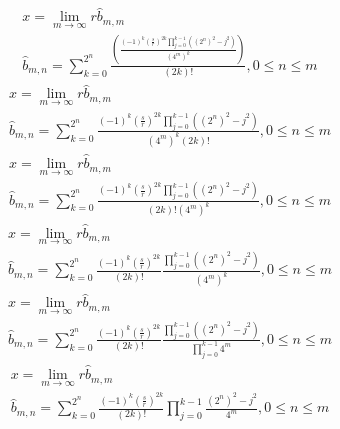 \documentclass[a4paper,12pt]{report}
\begin{document}
\begin{subequations}
\begin{gather}
x = \lim \limits_{m \to \infty} r \hat{b}_{m,m} \\
\hat{b}_{m,n} = \sum \limits_{k=0}^{2^n} \frac{\left(\frac{(-1)^k \left(\frac{s}{r}\right)^{2k} \prod \limits_{j=0}^{k-1} ((2^n)^2 - j^2)}{(4^m)^k}\right)}{(2k)!}, 0 \leq n \leq m
\end{gather}
\end{subequations}
\begin{subequations}
\begin{gather}
x = \lim \limits_{m \to \infty} r \hat{b}_{m,m} \\
\hat{b}_{m,n} = \sum \limits_{k=0}^{2^n} \frac{(-1)^k \left(\frac{s}{r}\right)^{2k} \prod \limits_{j=0}^{k-1} ((2^n)^2 - j^2)}{(4^m)^{k} (2k)!}, 0 \leq n \leq m
\end{gather}
\end{subequations}
\begin{subequations}
\begin{gather}
x = \lim \limits_{m \to \infty} r \hat{b}_{m,m} \\
\hat{b}_{m,n} = \sum \limits_{k=0}^{2^n} \frac{(-1)^k \left(\frac{s}{r}\right)^{2k} \prod \limits_{j=0}^{k-1} ((2^n)^2 - j^2)}{(2k)! (4^m)^k}, 0 \leq n \leq m
\end{gather}
\end{subequations}
\begin{subequations}
\begin{gather}
x = \lim \limits_{m \to \infty} r \hat{b}_{m,m} \\
\hat{b}_{m,n} = \sum \limits_{k=0}^{2^n} \frac{(-1)^k \left(\frac{s}{r}\right)^{2k}}{(2k)!} \frac{\prod \limits_{j=0}^{k-1} ((2^n)^2 - j^2)}{(4^m)^k}, 0 \leq n \leq m
\end{gather}
\end{subequations}
\begin{subequations}
\begin{gather}
x = \lim \limits_{m \to \infty} r \hat{b}_{m,m} \\
\hat{b}_{m,n} = \sum \limits_{k=0}^{2^n} \frac{(-1)^k \left(\frac{s}{r}\right)^{2k}}{(2k)!} \frac{\prod \limits_{j=0}^{k-1} ((2^n)^2 - j^2)}{\prod \limits_{j=0}^{k-1} 4^m}, 0 \leq n \leq m
\end{gather}
\end{subequations}
\begin{subequations}
\begin{gather}
x = \lim \limits_{m \to \infty} r \hat{b}_{m,m} \\
\hat{b}_{m,n} = \sum \limits_{k=0}^{2^n} \frac{(-1)^k \left(\frac{s}{r}\right)^{2k}}{(2k)!} \prod \limits_{j=0}^{k-1} \frac{(2^n)^2 - j^2}{4^m}, 0 \leq n \leq m
\end{gather}
\end{subequations}
\end{document}
